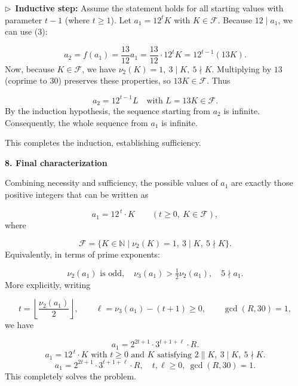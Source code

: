 \documentclass{llmxive}
\providecommand{\solutionheading}[1]{\par\smallskip\noindent\textbf{#1}\par}
\providecommand{\compactbullet}[1]{\par\noindent$\triangleright$~#1\par}
\begin{document}
\compactbullet{\textbf{Inductive step:} Assume the statement holds for all starting values with parameter \(t-1\) (where \(t\ge1\)). Let \(a_1=12^tK\) with \(K\in\mathcal{F}\). Because \(12\mid a_1\), we can use (3):}
\[
a_2=f(a_1)=\frac{13}{12}a_1=\frac{13}{12}\cdot12^tK=12^{t-1}(13K).
\]
Now, because \(K\in\mathcal{F}\), we have \(\nu_2(K)=1,\ 3\mid K,\ 5\nmid K\). Multiplying by \(13\) (coprime to \(30\)) preserves these properties, so \(13K\in\mathcal{F}\). Thus\par
\[
a_2=12^{t-1}L\quad\text{with }L=13K\in\mathcal{F}.
\]
By the induction hypothesis, the sequence starting from \(a_2\) is infinite. Consequently, the whole sequence from \(a_1\) is infinite.

This completes the induction, establishing sufficiency.

\solutionheading{8. Final characterization}
Combining necessity and sufficiency, the possible values of \(a_1\) are exactly those positive integers that can be written as

\[
a_1 = 12^{\,t} \cdot K \qquad (t\ge0,\ K\in\mathcal{F}),
\]
where\par
\[
\mathcal{F}=\bigl\{K\in\mathbb{N}\;\big|\; \nu_2(K)=1,\ 3\mid K,\ 5\nmid K\bigr\}.
\]
Equivalently, in terms of prime exponents:\par
\[
\nu_2(a_1)\text{ is odd},\quad \nu_3(a_1)>\tfrac12\nu_2(a_1),\quad 5\nmid a_1.
\]
More explicitly, writing\par
\[
t = \left\lfloor\frac{\nu_2(a_1)}{2}\right\rfloor,\qquad \ell = \nu_3(a_1)-(t+1)\ge0,\qquad \gcd(R,30)=1,
\]
we have\par
\[
a_1 = 2^{2t+1}\cdot3^{t+1+\ell}\cdot R.
\]
\[
\boxed{a_1 = 12^{\,t} \cdot K \text{ with } t \ge 0 \text{ and } K \text{ satisfying } 2\parallel K,\ 3\mid K,\ 5\nmid K.}
\]
\[
\boxed{a_1 = 2^{2t+1}\cdot 3^{t+1+\ell}\cdot R,\quad t,\ell\ge0,\ \gcd(R,30)=1.}
\]
This completely solves the problem.\par
\par
\end{document}
